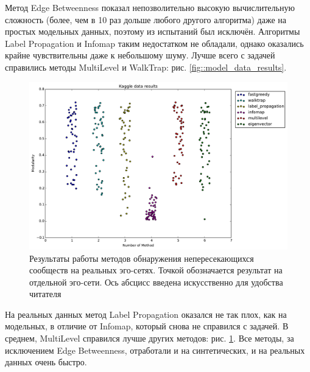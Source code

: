 \documentclass[12pt]{article}
\begin{document}
Метод Edge Betweenness показал непозволительно высокую вычислительную сложность (более, чем в 10 раз дольше любого другого алгоритма) даже на простых модельных данных, поэтому из испытаний был исключён. Алгоритмы Label Propagation и Infomap таким недостатком не обладали, однако оказались крайне чувствительны даже к небольшому шуму. Лучше всего с задачей справились методы MultiLevel и WalkTrap: рис. \ref{fig::model_data_results}.

\begin{figure}[h]
	\begin{center}
		\includegraphics[scale=0.35]{pics/kaggle_modularity}
	\end{center}
	\caption{Результаты работы методов обнаружения непересекающихся сообществ на реальных эго-сетях. Точкой обозначается результат на отдельной эго-сети. Ось абсцисс введена искусственно для удобства читателя \label{fig::modularity_kaggle}}
\end{figure}

На реальных данных метод Label Propagation оказался не так плох, как на модельных, в отличие от Infomap, который снова не справился с задачей. В среднем, MultiLevel справился лучше других методов: рис. \ref{fig::modularity_kaggle}. Все методы, за исключением Edge Betweenness, отработали и на синтетических, и на реальных данных очень быстро.
\end{document}
